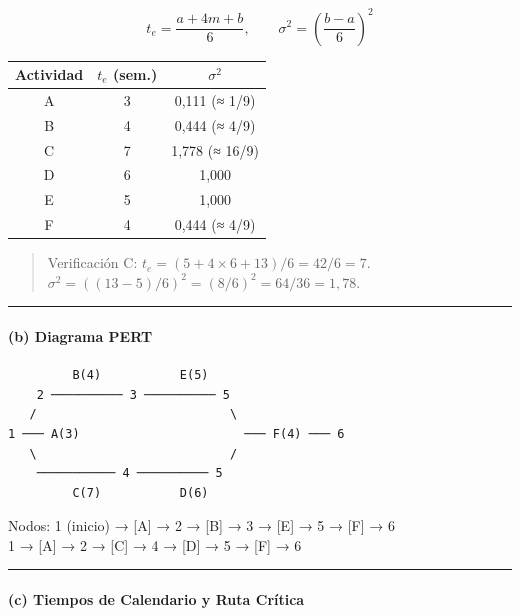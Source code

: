 \documentclass[
]{article}
\begin{document}
\[t_e = \frac{a + 4m + b}{6}, \qquad \sigma^2 = \left(\frac{b-a}{6}\right)^2\]

\begin{longtable}[]{@{}ccc@{}}
\toprule\noalign{}
Actividad & \(t_e\) (sem.) & \(\sigma^2\) \\
\midrule\noalign{}
\endhead
\bottomrule\noalign{}
\endlastfoot
A & 3 & 0,111 (≈ 1/9) \\
B & 4 & 0,444 (≈ 4/9) \\
C & 7 & 1,778 (≈ 16/9) \\
D & 6 & 1,000 \\
E & 5 & 1,000 \\
F & 4 & 0,444 (≈ 4/9) \\
\end{longtable}

\begin{quote}
Verificación C: \(t_e = (5 + 4 \times 6 + 13)/6 = 42/6 = 7\).
\(\sigma^2 = ((13-5)/6)^2 = (8/6)^2 = 64/36 = 1{,}78\).
\end{quote}

\begin{center}\rule{0.5\linewidth}{0.5pt}\end{center}

\hypertarget{b-diagrama-pert}{%
\paragraph{(b) Diagrama PERT}\label{b-diagrama-pert}}

\begin{verbatim}
         B(4)           E(5)
    2 ────────── 3 ────────── 5
   /                           \
1 ─── A(3)                       ─── F(4) ─── 6
   \                           /
    ─────────── 4 ────────── 5
         C(7)           D(6)
\end{verbatim}

Nodos: 1 (inicio) → {[}A{]} → 2 → {[}B{]} → 3 → {[}E{]} → 5 → {[}F{]} →
6\\
1 → {[}A{]} → 2 → {[}C{]} → 4 → {[}D{]} → 5 → {[}F{]} → 6

\begin{center}\rule{0.5\linewidth}{0.5pt}\end{center}

\hypertarget{c-tiempos-de-calendario-y-ruta-cruxedtica}{%
\paragraph{(c) Tiempos de Calendario y Ruta
Crítica}\label{c-tiempos-de-calendario-y-ruta-cruxedtica}}
\end{document}

